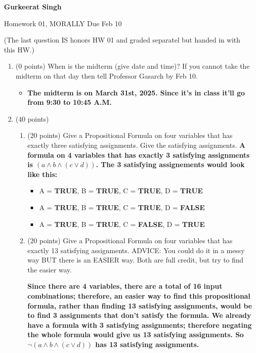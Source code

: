\documentclass[12pt]{article}
\begin{document}
\centerline{\textbf{Gurkeerat Singh}}


\centerline{Homework 01, MORALLY Due Feb 10}
\newcommand{\implies}{\Rightarrow}

(The last question IS honors HW 01 and graded separatel but handed in
with this HW.) 


\begin{enumerate}

\item
(0 points)
When is the midterm (give date and time)?
If you cannot take the midterm on that day then tell 
Professor Gasarch by Feb 10. 
\begin{itemize}
    \item \textbf{The midterm is on March 31st, 2025. Since it's in class it'll go from 9:30 to 10:45 A.M.}
\end{itemize}

\bigskip

\newpage

\item
(40 points)
\begin{enumerate}
\item 
(20 points)
Give a Propositional Formula on four variables that has exactly
three satisfying assignments.
Give the satisfying assignments.
\textbf {A formula on 4 variables that has exactly 3 satisfying assignments is $ (a \wedge b \wedge (c \vee d)) $. The 3 satisfying assignements would look like this:}
\begin{itemize}
    \item A = \textbf{TRUE}, B = \textbf{TRUE}, C = \textbf{TRUE}, D = \textbf{TRUE}
    \item A = \textbf{TRUE}, B = \textbf{TRUE}, C = \textbf{TRUE}, D = \textbf{FALSE}
    \item A = \textbf{TRUE}, B = \textbf{TRUE}, C = \textbf{FALSE}, D = \textbf{TRUE}
\end{itemize}


\bigskip

\item 
(20 points)
Give a Propositional Formula on four variables that has exactly
13 satisfying assignments.
ADVICE: You could do it in a messy way BUT there is an EASIER way.
Both are full credit, but try to find the easier way. 

\textbf{Since there are 4 variables, there are a total of 16 input combinations; therefore, an easier way to find this propositional formula, rather than finding 13 satisfying assignments, would be to find 3 assignments that don't satisfy the formula. We already have a formula with 3 satisfying assignments; therefore negating the whole formula would give us 13 satisfying assignments. So $ \neg (a \wedge b \wedge (c \vee d)) $ has 13 satisfying assignments.
}


\end{enumerate}
\end{enumerate}
\end{document}
